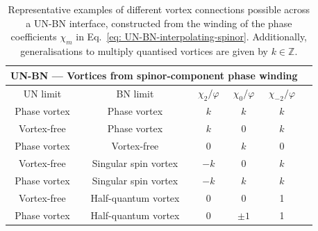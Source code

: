 \begin{table}
    \centering
    \begin{tabular}{cccccc}
        \toprule
        \multicolumn{5}{c}{UN-BN --- Vortices from spinor-component phase
        winding} \\
        \midrule
        UN limit & BN limit &  \(\chi_2/\varphi \) & \(\chi_0/\varphi \) &
        \(\chi_{-2}/\varphi \)  \\
        \midrule
        Phase vortex & Phase vortex & \(k\) & \(k\) &
         \(k\) \\ 
         Vortex-free & Phase vortex & \(k\) & 0 & \(k\) \\
        Phase vortex & Vortex-free & 0 & \(k\) & 0\\
         Vortex-free & Singular spin vortex  & \(-k\) & 0 & \(k\) \\
        Phase vortex & Singular spin vortex  & \(-k\) & \(k\) &
         \(k\) \\
         Vortex-free & Half-quantum vortex  & 0 & 0 & 1 \\
        Phase vortex & Half-quantum vortex  & 0 & \(\pm 1\) & 1 \\
        \bottomrule
    \end{tabular}
    \caption[Examples of possible vortex connections across a uniaxial nematic
    to biaxial nematic interface]{\label{tab: UN-BN-vortices}
    Representative examples of different vortex connections possible across a
    UN-BN interface, constructed from the winding of the phase coefficients
    \(\chi_m\) in Eq.~\eqref{eq: UN-BN-interpolating-spinor}.
    Additionally, generalisations to multiply quantised vortices are given by
    \(k \in \mathbb{Z}\).}
\end{table}

